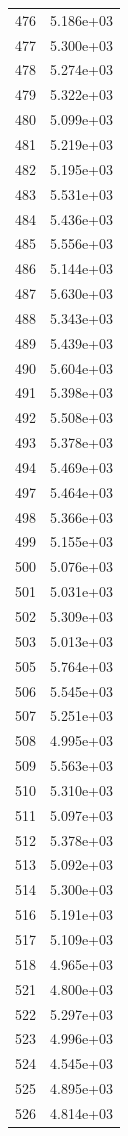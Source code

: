 \documentclass[12pt]{article}
\begin{document}
\begin{longtable}{@{}cc@{}}
476 & 5.186e+03 \\
477 & 5.300e+03 \\
478 & 5.274e+03 \\
479 & 5.322e+03 \\
480 & 5.099e+03 \\
481 & 5.219e+03 \\
482 & 5.195e+03 \\
483 & 5.531e+03 \\
484 & 5.436e+03 \\
485 & 5.556e+03 \\
486 & 5.144e+03 \\
487 & 5.630e+03 \\
488 & 5.343e+03 \\
489 & 5.439e+03 \\
490 & 5.604e+03 \\
491 & 5.398e+03 \\
492 & 5.508e+03 \\
493 & 5.378e+03 \\
494 & 5.469e+03 \\
497 & 5.464e+03 \\
498 & 5.366e+03 \\
499 & 5.155e+03 \\
500 & 5.076e+03 \\
501 & 5.031e+03 \\
502 & 5.309e+03 \\
503 & 5.013e+03 \\
505 & 5.764e+03 \\
506 & 5.545e+03 \\
507 & 5.251e+03 \\
508 & 4.995e+03 \\
509 & 5.563e+03 \\
510 & 5.310e+03 \\
511 & 5.097e+03 \\
512 & 5.378e+03 \\
513 & 5.092e+03 \\
514 & 5.300e+03 \\
516 & 5.191e+03 \\
517 & 5.109e+03 \\
518 & 4.965e+03 \\
521 & 4.800e+03 \\
522 & 5.297e+03 \\
523 & 4.996e+03 \\
524 & 4.545e+03 \\
525 & 4.895e+03 \\
526 & 4.814e+03 \\

\end{longtable}
\end{document}
